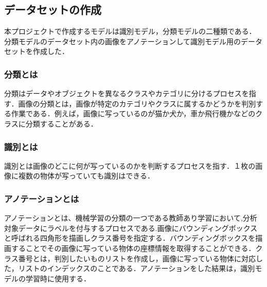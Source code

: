 \begin{multicols*}{2}
\subsection{データセットの作成}
本プロジェクトで作成するモデルは識別モデル，分類モデルの二種類である．%
分類モデルのデータセット内の画像をアノテーションして識別モデル用のデータセットを作成した．


\subsubsection{分類とは}
分類はデータやオブジェクトを異なるクラスやカテゴリに分けるプロセスを指す．画像の分類とは，画像が特定のカテゴリやクラスに属するかどうかを判別する作業である．例えば，画像に写っているのが猫か犬か，車か飛行機かなどのクラスに分類することがある．
\subsubsection{識別とは}
識別とは画像のどこに何が写っているのかを判断するプロセスを指す．１枚の画像に複数の物体が写っていても識別はできる．

\subsubsection{アノテーションとは}
アノテーションとは、機械学習の分類の一つである教師あり学習において,分析対象データにラベルを付与するプロセスである.画像にバウンディングボックスと呼ばれる四角形を描画しクラス番号を指定する．バウンディングボックスを描画することでその画像に写っている物体の座標情報を取得することができる．クラス番号とは，判別したいものリストを作成し，画像に写っている物体に対応した，リストのインデックスのことである．アノテーションをした結果は，識別モデルの学習時に使用する．




\end{multicols*}
